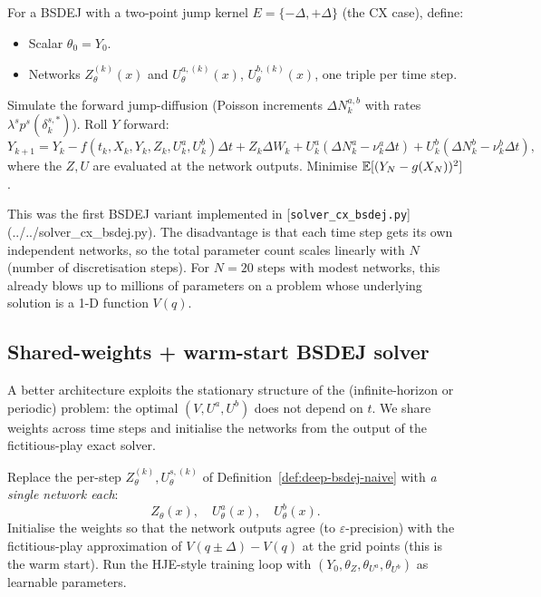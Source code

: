 \begin{definition}
\label{def:deep-bsdej-naive}
For a BSDEJ with a two-point jump kernel $E = \{-\Delta, +\Delta\}$ (the CX case), define:
\begin{itemize}
  \item Scalar $\theta_0 = Y_0$.
  \item Networks $Z_\theta^{(k)}(x)$ and $U_\theta^{a, (k)}(x)$, $U_\theta^{b, (k)}(x)$, one triple per time step.
\end{itemize}
Simulate the forward jump-diffusion (Poisson increments $\Delta N^{a,b}_k$ with rates $\lambda^s p^s(\delta^{s,*}_k)$). Roll $Y$ forward:
\begin{equation}
  Y_{k+1} = Y_k - f(t_k, X_k, Y_k, Z_k, U^a_k, U^b_k) \Delta t + Z_k \Delta W_k + U^a_k (\Delta N^a_k - \nu^a_k \Delta t) + U^b_k (\Delta N^b_k - \nu^b_k \Delta t),
  \label{eq:bsdej-roll}
\end{equation}
where the $Z, U$ are evaluated at the network outputs. Minimise $\mathbb{E}[(Y_N - g(X_N))^2]$.
\end{definition}

This was the first BSDEJ variant implemented in [\texttt{solver\_cx\_bsdej.py}](../../solver_cx_bsdej.py). The disadvantage is that each time step gets its own independent networks, so the total parameter count scales linearly with $N$ (number of discretisation steps). For $N = 20$ steps with modest networks, this already blows up to millions of parameters on a problem whose underlying solution is a 1-D function $V(q)$.

\subsection{Shared-weights + warm-start BSDEJ solver}

A better architecture exploits the stationary structure of the (infinite-horizon or periodic) problem: the optimal $(V, U^a, U^b)$ does not depend on $t$. We share weights across time steps and initialise the networks from the output of the fictitious-play exact solver.

\begin{definition}
\label{def:deep-bsdej-shared}
Replace the per-step $Z_\theta^{(k)}, U_\theta^{s, (k)}$ of Definition~\ref{def:deep-bsdej-naive} with \emph{a single network each}:
\[
  Z_\theta(x), \quad U_\theta^a(x), \quad U_\theta^b(x).
\]
Initialise the weights so that the network outputs agree (to $\varepsilon$-precision) with the fictitious-play approximation of $V(q \pm \Delta) - V(q)$ at the grid points (this is the warm start). Run the HJE-style training loop with $(Y_0, \theta_{Z}, \theta_{U^a}, \theta_{U^b})$ as learnable parameters.
\end{definition}

